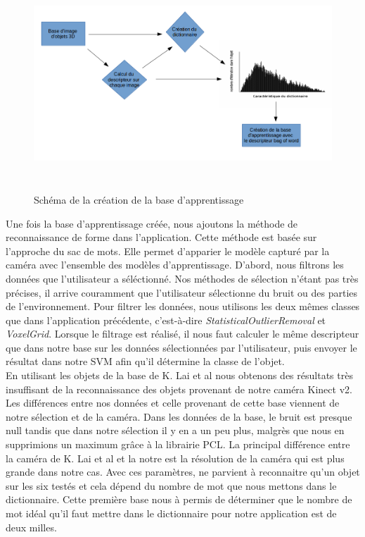 \begin{figure}[!ht]
  \begin{center}
    \includegraphics[height=8cm]{image/schemaBase.png}
    \caption{Schéma de la création de la base d'apprentissage}
  \end{center}
\end{figure}
Une fois la base d'apprentissage créée, nous ajoutons la méthode de reconnaissance de forme dans l'application. Cette méthode est basée
sur l'approche du sac de mots. Elle permet d'apparier le modèle capturé par la caméra avec l'ensemble des modèles d'apprentissage.
D'abord, nous filtrons les données que l'utilisateur a séléctionné. Nos méthodes de sélection n'étant pas très précises, il arrive
couramment que l'utilisateur sélectionne du bruit ou des parties de l'environnement. Pour filtrer les données, nous utilisons
les deux mêmes classes que dans l'application précédente, c'est-à-dire \textit{StatisticalOutlierRemoval} et \textit{VoxelGrid}.
Lorsque le filtrage est réalisé, il nous faut calculer le même descripteur que dans notre base sur les données sélectionnées par 
l'utilisateur, puis envoyer le résultat dans notre SVM afin qu'il détermine la classe de l'objet.\\

En utilisant les objets de la base de K. Lai et al\cite{Base1} nous obtenons des résultats très insuffisant de la reconnaissance 
des objets provenant de notre caméra Kinect v2. Les différences entre nos données et celle provenant de cette base viennent
de notre sélection et de la caméra. Dans les données de la base, le bruit est presque null tandis que dans notre sélection il 
y en a un peu plus, malgrès que nous en supprimions un maximum grâce à la librairie PCL. La principal différence entre la caméra
de K. Lai et al\cite{Base1} et la notre est la résolution de la caméra qui est plus grande dans notre cas. Avec ces paramètres, ne parvient
à reconnaitre qu'un objet sur les six testés et cela dépend du nombre de mot que nous mettons dans le dictionnaire. Cette première base nous 
à permis de déterminer que le nombre de mot idéal qu'il faut mettre dans le dictionnaire pour notre application est de deux milles.\\

